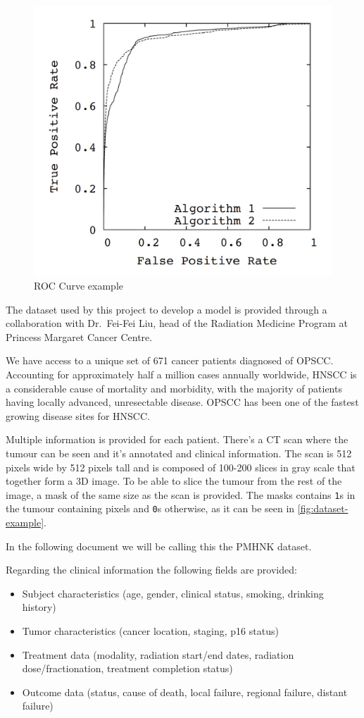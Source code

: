 \begin{figure}
  \centering
  \includegraphics[width=.5\linewidth]{images/roc_curve}
  \caption{\acrshort{ROC} Curve example\label{fig:ROC-curve}}
\end{figure}


The dataset used by this project to develop a model is provided through a 
collaboration with Dr.~Fei-Fei Liu, head of the Radiation Medicine Program at Princess
Margaret Cancer Centre.

We have access to a unique set of 671 cancer patients diagnosed of \gls{OPSCC}. Accounting
for approximately half a million cases annually worldwide, \gls{HNSCC} 
is a considerable cause of mortality and morbidity, with the majority of patients having
locally advanced, unresectable disease. \gls{OPSCC} has been one of the fastest growing 
disease sites for \gls{HNSCC}.
~\cite{medical:ct-based-radiomic-signature}

Multiple information is provided for each patient. There's a \gls{CT} scan where the tumour 
can be seen and it's annotated and clinical information. The scan is 512 pixels wide by 512 
pixels tall and is composed of 100-200 slices in gray scale that together form a 3D image. 
To be able to slice the tumour from the rest of the image, a mask of the same size as the scan 
is provided. The masks contains \texttt{1}s in the tumour containing pixels and \texttt{0}s
otherwise, as it can be seen in \autoref{fig:dataset-example}.

In the following document we will be calling this the \gls{PMHNK} dataset.

Regarding the clinical information the following fields are provided:
\begin{itemize}
  \item Subject characteristics (age, gender, clinical status, smoking, drinking history)
  \item Tumor characteristics (cancer location, staging, p16 status)
  \item Treatment data (modality, radiation start/end dates, radiation dose/fractionation, 
  treatment completion status)
  \item Outcome data (status, cause of death, local failure, regional failure, distant failure)
\end{itemize}

